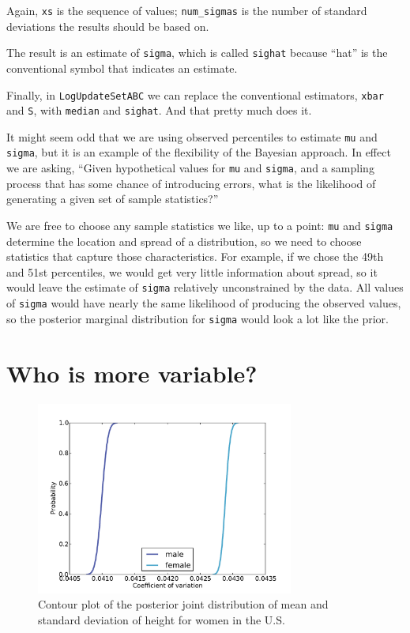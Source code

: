 \documentclass[12pt]{book}
\begin{document}
Again, {\tt xs} is the sequence of values; \verb"num_sigmas" is
the number of standard deviations the results should be based on.

The result is an estimate of {\tt sigma}, which is called {\tt sighat}
because ``hat'' is the conventional symbol that indicates an
estimate.

Finally, in {\tt LogUpdateSetABC} we can replace the
conventional estimators, {\tt xbar} and {\tt S}, with {\tt median}
and {\tt sighat}.  And that pretty much does it.

It might seem odd that we are using observed percentiles to
estimate {\tt mu} and {\tt sigma}, but it is an example of the
flexibility of the Bayesian approach.  In effect we are asking,
``Given hypothetical values for {\tt mu} and {\tt sigma}, and
a sampling process that has some chance of introducing errors,
what is the likelihood of generating a given set of sample
statistics?''

We are free to choose any sample statistics we like, up to a point:
{\tt mu} and {\tt sigma} determine the location and spread of
a distribution, so we need to choose statistics that capture those
characteristics.  For example, if we chose the 49th and 51st percentiles,
we would get very little information about spread, so it
would leave the estimate of {\tt sigma} relatively unconstrained
by the data.  All values of {\tt sigma} would have nearly the
same likelihood of producing the observed values, so the posterior
marginal distribution for {\tt sigma} would look a lot like the
prior.


\section{Who is more variable?}

\begin{figure}
\centerline{\includegraphics[height=2.5in]{figs/variability_cv.pdf}}
\caption{Contour plot of the posterior joint distribution of
mean and standard deviation of height for women in the U.S.}
\label{fig.variability3}
\end{figure}
\end{document}
